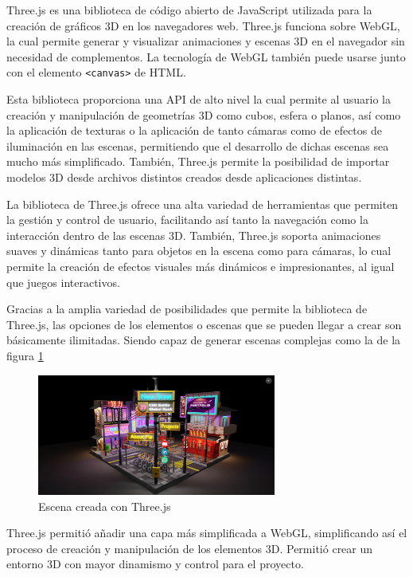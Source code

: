 \documentclass[a4paper, 12pt]{book}
\begin{document}
Three.js \cite{dirksen2015} es una biblioteca de código abierto de JavaScript utilizada para la creación de gráficos 3D en los navegadores web. Three.js funciona sobre WebGL, la cual permite generar y visualizar animaciones y escenas 3D en el navegador sin necesidad de complementos. La tecnología de WebGL también puede usarse junto con el elemento \texttt{<canvas>} de HTML.

Esta biblioteca proporciona una API de alto nivel la cual permite al usuario la creación y manipulación de geometrías 3D como cubos, esfera o planos, así como la aplicación de texturas o la aplicación de tanto cámaras como de efectos de iluminación en las escenas, permitiendo que el desarrollo de dichas escenas sea mucho más simplificado. 
También, Three.js permite la posibilidad de importar modelos 3D desde archivos distintos creados desde aplicaciones distintas.

La biblioteca de Three.js ofrece una alta variedad de herramientas que permiten la gestión y control de usuario, facilitando así tanto la navegación como la interacción dentro de las escenas 3D. También, Three.js soporta animaciones suaves y dinámicas tanto para objetos en la escena como para cámaras, lo cual permite la creación de efectos visuales más dinámicos e impresionantes, al igual que juegos interactivos. 

Gracias a la amplia variedad de posibilidades que permite la biblioteca de Three.js, las opciones de los elementos o escenas que se pueden llegar a crear son básicamente ilimitadas. Siendo capaz de generar escenas complejas como la de la figura \ref{fig:three}
\begin{figure}[H] 
  \centering
  \includegraphics[width=0.7\textwidth]{img/three.jpeg}
  \caption{Escena creada con Three.js}
  \label{fig:three}
\end{figure}

Three.js permitió añadir una capa más simplificada a WebGL, simplificando así el proceso de creación y manipulación de los elementos 3D. Permitió crear un entorno 3D con mayor dinamismo y control para el proyecto.
\end{document}
